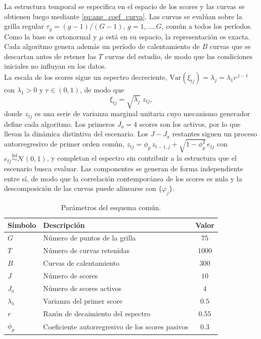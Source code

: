 La estructura temporal se especifica en el espacio de los scores y las curvas se obtienen luego mediante \eqref{eq:ane_coef_curva}. Las curvas se evalúan sobre la grilla regular $\tau_g = (g-1)/(G-1)$, $g = 1, \dots, G$, común a todos los períodos. Como la base es ortonormal y $\mu$ está en su espacio, la representación es exacta.\\

Cada algoritmo genera además un período de calentamiento de $B$ curvas que se descartan antes de retener las $T$ curvas del estudio, de modo que las condiciones iniciales no influyan en los datos.\\

La escala de los scores sigue un espectro decreciente, $\mathrm{Var}(\xi_{tj})=\lambda_j=\lambda_1 r^{\,j-1}$ con $\lambda_1>0$ y $r\in(0,1)$, de modo que
\begin{equation}
\label{eq:ane_escala}
\xi_{tj} = \sqrt{\lambda_j}\; z_{tj},
\end{equation}
donde $z_{tj}$ es una serie de varianza marginal unitaria cuyo mecanismo generador define cada algoritmo. Los primeros $J_a=4$ scores son los activos, por lo que llevan la dinámica distintiva del escenario. Los $J-J_a$ restantes siguen un proceso autorregresivo de primer orden común, $z_{tj}=\phi_p\, z_{t-1,j}+\sqrt{1-\phi_p^{2}}\,e_{tj}$ con $e_{tj}\overset{\mathrm{iid}}{\sim}\mathcal{N}(0,1)$, y completan el espectro sin contribuir a la estructura que el escenario busca evaluar. Las componentes se generan de forma independiente entre sí, de modo que la correlación contemporánea de los scores es nula y la descomposición de las curvas puede alinearse con $\{\varphi_j\}$.\\

\begin{table}[H]
\centering
\caption{Parámetros del esquema común.}
\label{tab:ane_comun}
\begin{tabular}{llc}
\hline
Símbolo & Descripción & Valor \\
\hline
$G$          & Número de puntos de la grilla                             & $75$ \\
$T$          & Número de curvas retenidas                                & $1000$ \\
$B$          & Curvas de calentamiento                                   & $300$ \\
$J$          & Número de scores                                          & $10$ \\
$J_a$        & Número de scores activos                                  & $4$ \\
$\lambda_1$  & Varianza del primer score                                 & $0.5$ \\
$r$          & Razón de decaimiento del espectro                        & $0.55$ \\
$\phi_p$     & Coeficiente autorregresivo de los scores pasivos          & $0.3$ \\
\hline
\end{tabular}
\end{table}

